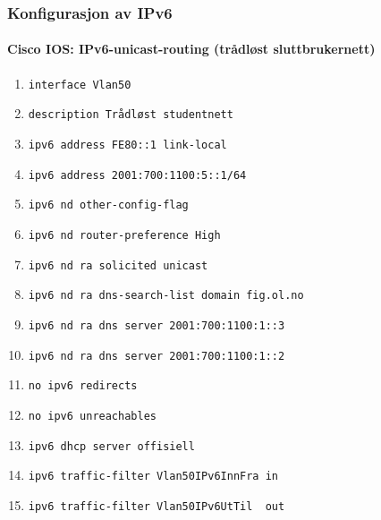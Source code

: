 \begin{frame}
  \frametitle{Konfigurasjon av IPv6}
  \framesubtitle{Cisco IOS: IPv6-unicast-routing (trådløst sluttbrukernett)}
  \begin{enumerate}
  \item \alert{\texttt{interface Vlan50}}
  \item \texttt{description Trådløst studentnett}
  \item \texttt{ipv6 address FE80::1 link-local}
  \item \texttt{ipv6 address 2001:700:1100:5::1/64}
  \item \texttt{ipv6 nd other-config-flag}
  \item \texttt{ipv6 nd router-preference High}
  \item \alert{\texttt{ipv6 nd ra solicited unicast}}
  \item \texttt{ipv6 nd ra dns-search-list domain fig.ol.no}
  \item \texttt{ipv6 nd ra dns server 2001:700:1100:1::3}
  \item \texttt{ipv6 nd ra dns server 2001:700:1100:1::2}
  \item \texttt{no ipv6 redirects}
  \item \texttt{no ipv6 unreachables}
  \item \texttt{ipv6 dhcp server offisiell}
  \item \texttt{ipv6 traffic-filter Vlan50IPv6InnFra in}
  \item \texttt{ipv6 traffic-filter Vlan50IPv6UtTil\ \ out}
  \end{enumerate}
\end{frame}

